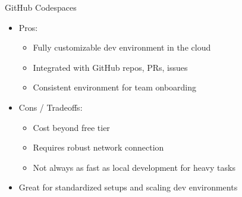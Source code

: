 \documentclass[aspectratio=169]{beamer}
\begin{document}
%
\begin{frame}{GitHub Codespaces}
\begin{itemize}
\item Pros:
  \begin{itemize}
    \item Fully customizable dev environment in the cloud
    \item Integrated with GitHub repos, PRs, issues
    \item Consistent environment for team onboarding
  \end{itemize}
\item Cons / Tradeoffs:
  \begin{itemize}
    \item Cost beyond free tier
    \item Requires robust network connection
    \item Not always as fast as local development for heavy tasks
  \end{itemize}
\item Great for standardized setups and scaling dev environments
\end{itemize}
\end{frame}
\end{document}
